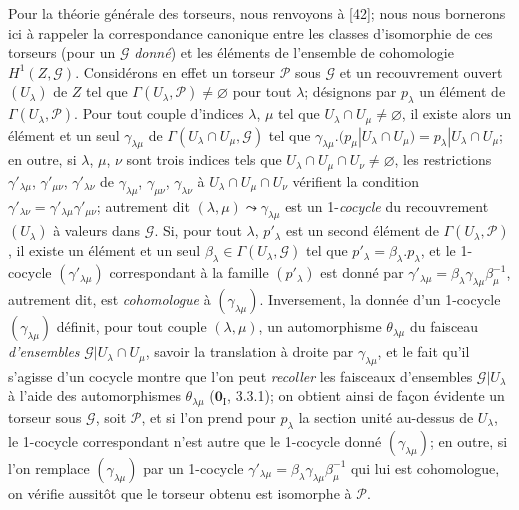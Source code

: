 \begin{env}[16.5.15]
Pour la théorie générale des torseurs, nous renvoyons à [42]; nous nous
bornerons ici à rappeler la correspondance canonique entre les classes
d'isomorphie de ces torseurs (pour un $\mathscr{G}$ \emph{donné}) et les éléments de
l'ensemble de cohomologie $H^1(Z,\mathscr{G})$. Considérons en effet un
torseur $\mathscr{P}$ sous $\mathscr{G}$ et un recouvrement ouvert
$(U_\lambda)$ de $Z$ tel que
$\Gamma(U_\lambda,\mathscr{P})\neq\varnothing$ pour tout $\lambda$;
désignons par $p_\lambda$ un élément de
$\Gamma(U_\lambda,\mathscr{P})$. Pour tout couple d'indices $\lambda$, $\mu$
tel que $U_\lambda\cap U_\mu\neq\varnothing$, il existe alors un élément et
un seul $\gamma_{\lambda\mu}$ de
$\Gamma(U_\lambda\cap U_\mu,\mathscr{G})$ tel que
$\gamma_{\lambda\mu}.(p_\mu|U_\lambda\cap U_\mu)=p_\lambda|U_\lambda\cap U_\mu$;
en outre, si $\lambda$, $\mu$, $\nu$ sont trois indices tels que
$U_\lambda\cap U_\mu\cap U_\nu\neq\varnothing$, les restrictions
$\gamma'_{\lambda\mu}$, $\gamma'_{\mu\nu}$, $\gamma'_{\lambda\nu}$ de
$\gamma_{\lambda\mu}$, $\gamma_{\mu\nu}$, $\gamma_{\lambda\nu}$ à
$U_\lambda\cap U_\mu\cap U_\nu$ vérifient la condition
$\gamma'_{\lambda\nu}=\gamma'_{\lambda\mu}\gamma'_{\mu\nu}$; autrement dit
$(\lambda,\mu)\leadsto\gamma_{\lambda\mu}$ est un 1-\emph{cocycle} du
recouvrement $(U_\lambda)$ à valeurs dans $\mathscr{G}$. Si, pour tout
$\lambda$, $p'_\lambda$ est un second élément de
$\Gamma(U_\lambda,\mathscr{P})$, il existe un élément et un seul
$\beta_\lambda\in\Gamma(U_\lambda,\mathscr{G})$ tel que
$p'_\lambda=\beta_\lambda.p_\lambda$, et le 1-cocycle
$(\gamma'_{\lambda\mu})$ correspondant à la famille $(p'_\lambda)$ est donné
par $\gamma'_{\lambda\mu}=\beta_\lambda\gamma_{\lambda\mu}\beta_\mu^{-1}$,
autrement dit, est \emph{cohomologue} à $(\gamma_{\lambda\mu})$.
Inversement, la donnée d'un 1-cocycle $(\gamma_{\lambda\mu})$ définit, pour
tout couple $(\lambda,\mu)$, un automorphisme $\theta_{\lambda\mu}$ du
faisceau \emph{d'ensembles}
$\mathscr{G}|U_\lambda\cap U_\mu$, savoir la translation à droite par
$\gamma_{\lambda\mu}$, et le fait qu'il s'agisse d'un cocycle montre que l'on
peut \emph{recoller} les faisceaux d'ensembles $\mathscr{G}|U_\lambda$ à
l'aide des automorphismes $\theta_{\lambda\mu}$ ($\mathbf{0}_{\mathrm I}$, 3.3.1); on obtient ainsi
de façon évidente un torseur sous $\mathscr{G}$, soit $\mathscr{P}$, et si
l'on prend pour $p_\lambda$ la section unité au-dessus de $U_\lambda$, le
1-cocycle correspondant n'est autre que le 1-cocycle donné
$(\gamma_{\lambda\mu})$; en outre, si l'on remplace
$(\gamma_{\lambda\mu})$ par un 1-cocycle
$\gamma'_{\lambda\mu}=\beta_\lambda\gamma_{\lambda\mu}\beta_\mu^{-1}$ qui
lui est cohomologue, on vérifie aussitôt que le torseur obtenu est isomorphe
à $\mathscr{P}$.


\end{env}
